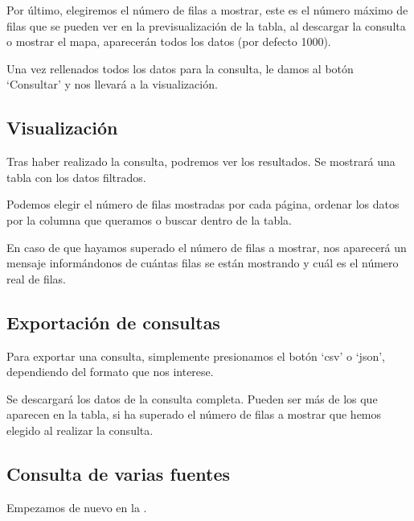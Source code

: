 Por último, elegiremos el número de filas a mostrar, este es el número máximo de filas que se pueden ver en la previsualización de la tabla, al descargar la consulta o mostrar el mapa, aparecerán todos los datos (por defecto 1000).


Una vez rellenados todos los datos para la consulta, le damos al botón `Consultar' y nos llevará a la visualización.

\subsection{Visualización} \label{visualizacion}

Tras haber realizado la consulta, podremos ver los resultados. Se mostrará una tabla con los datos filtrados.

Podemos elegir el número de filas mostradas por cada página, ordenar los datos por la columna que queramos o buscar dentro de la tabla. 


En caso de que hayamos superado el número de filas a mostrar, nos aparecerá un mensaje informándonos de cuántas filas se están mostrando y cuál es el número real de filas.


\subsection{Exportación de consultas} \label{exportar}

Para exportar una consulta, simplemente presionamos el botón `csv' o `json', dependiendo del formato que nos interese.

Se descargará los datos de la consulta completa. Pueden ser más de los que aparecen en la tabla, si ha superado el número de filas a mostrar que hemos elegido al realizar la consulta.


\subsection{Consulta de varias fuentes}

Empezamos de nuevo en la .

